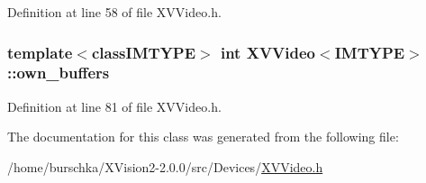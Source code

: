 Definition at line 58 of file XVVideo.h.\label{XVVideo_n7}
\hypertarget{class_XVVideo_n7}{
\subsubsection[own_buffers]{\setlength{\rightskip}{0pt plus 5cm}template$<$classIMTYPE$>$ int XVVideo$<$IMTYPE$>$::own\_\-buffers}}




Definition at line 81 of file XVVideo.h.

The documentation for this class was generated from the following file:\begin{CompactItemize}
\item 
/home/burschka/XVision2-2.0.0/src/Devices/\hyperlink{XVVideo.h-source}{XVVideo.h}\end{CompactItemize}
